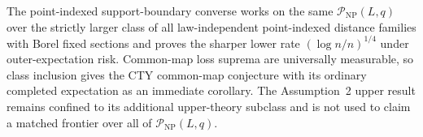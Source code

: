 The point-indexed support-boundary converse works on the same \(\mathcal P_{\mathrm{NP}}(L,q)\) over the strictly larger class of all law-independent point-indexed distance families with Borel fixed sections and proves the sharper lower rate \((\log n/n)^{1/4}\) under outer-expectation risk.  Common-map loss suprema are universally measurable, so class inclusion gives the CTY common-map conjecture with its ordinary completed expectation as an immediate corollary.  The Assumption~2 upper result remains confined to its additional upper-theory subclass and is not used to claim a matched frontier over all of \(\mathcal P_{\mathrm{NP}}(L,q)\).